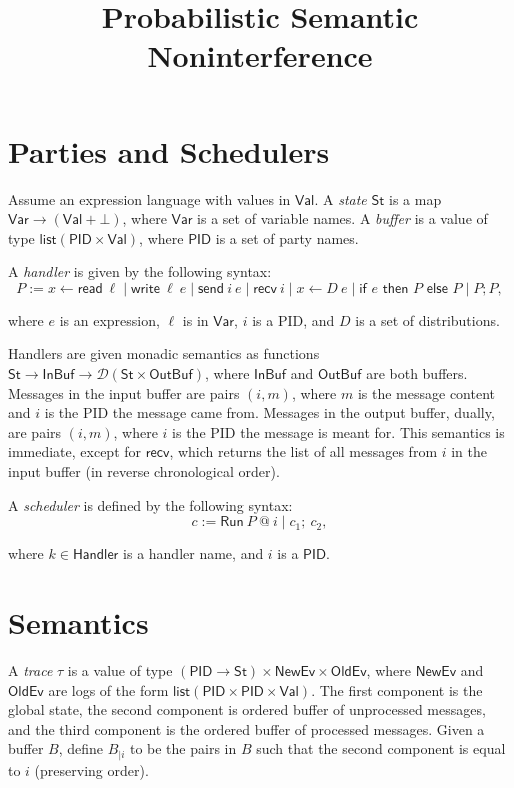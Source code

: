 \documentclass{article}
\title {Probabilistic Semantic Noninterference}
\newcommand{\Val}{\mathsf{Val}}
\newcommand{\St}{\mathsf{St}}
\newcommand{\InBuf}{\mathsf{InBuf}}
\newcommand{\OutBuf}{\mathsf{OutBuf}}
\newcommand{\PID}{\mathsf{PID}}
\newcommand{\Var}{\mathsf{Var}}
\newcommand{\Handler}{\mathsf{Handler}}
\renewcommand{\list}{\mathsf{list}}
\newcommand{\D}{\mathcal{D}}
\newcommand{\NewEv}{\mathsf{NewEv}}
\newcommand{\OldEv}{\mathsf{OldEv}}
\newcommand{\Read}{\mathsf{read}}
\newcommand{\Write}{\mathsf{write}}
\newcommand{\send}{\mathsf{send}}
\newcommand{\recv}{\mathsf{recv}}
\begin{document}
\maketitle

\section{Parties and Schedulers}

Assume an expression language with values in $\Val$. A \emph{state} $\St$ is a map $\Var \to (\Val + \bot)$, where $\Var$ is a set of variable names. A \emph{buffer} is a value of type $\list (\PID \times \Val)$, where $\PID$ is a set of party names.

A \emph{handler} is given by the following syntax:
\[ P := x \leftarrow \Read\ \ell \mid \Write\ \ell\ e \mid \send\ i\ e \mid \recv\ i \mid x \leftarrow D\ e \mid \textsf{if } e \textsf{ then } P \textsf{ else } P \mid P; P, \]

where $e$ is an expression, $\ell$ is in $\Var$, $i$ is a PID, and $D$ is a set of distributions.

Handlers are given monadic semantics as functions $\St \to \InBuf \to \D(\St \times \OutBuf)$, where $\InBuf$ and $\OutBuf$ are both buffers. Messages in the input buffer are pairs $(i,m)$, where $m$ is the message content and $i$ is the PID the message came from. Messages in the output buffer, dually, are pairs $(i,m)$, where $i$ is the PID the message is meant for. This semantics is immediate, except for $\recv$, which returns the list of all messages from $i$ in the input buffer (in reverse chronological order).

A \emph{scheduler} is defined by the following syntax:
\[ c := \textsf{Run}\ P\ @\ i \mid c_1;\ c_2, \]

where $k \in \Handler$ is a handler name, and $i$ is a $\PID$.

\section{Semantics}

A \emph{trace} $\tau$ is a value of type $(\PID \to \St) \times \NewEv \times \OldEv$, where $\NewEv$ and $\OldEv$ are logs of the form $\list (\PID \times \PID \times \Val)$. The first component is the global state, the second component is ordered buffer of unprocessed messages, and the third component is the ordered buffer of processed messages. Given a buffer $B$, define $B_{| i}$ to be the pairs in $B$ such that the second component is equal to $i$ (preserving order).
\end{document}
